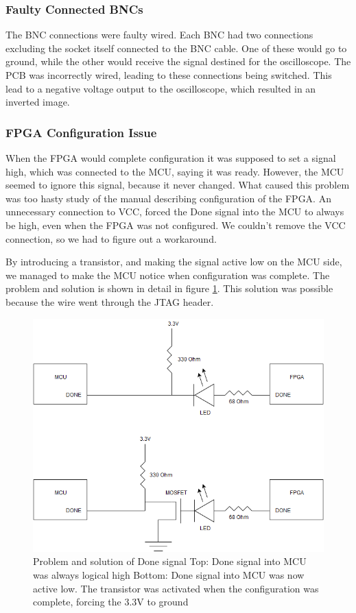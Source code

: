 \subsubsection{Faulty Connected BNCs}
The BNC connections were faulty wired. Each BNC had two connections excluding the socket itself connected to the BNC cable. One of these would go to ground, while the other would receive the signal destined for the oscilloscope. The PCB was incorrectly wired, leading to these connections being switched. This lead to a negative voltage output to the oscilloscope, which resulted in an inverted image. 

\subsubsection{FPGA Configuration Issue}
When the FPGA would complete configuration it was supposed to set a signal high, which was connected to the MCU, saying it was ready. However, the MCU seemed to ignore this signal, because it never changed. What caused this problem was too hasty study of the manual describing configuration of the FPGA.
An unnecessary connection to VCC, forced the Done signal into the MCU to always be high, even when the FPGA was not configured. We couldn't remove the VCC connection, so we had to figure out a workaround.

By introducing a transistor, and making the signal active low on the MCU side, we managed to make the MCU notice when configuration was complete.
The problem and solution is shown in detail in figure \ref{fig:Done Issue}.
This solution was possible because the wire went through the JTAG header. 

\begin{figure}[h!]
\centering
\includegraphics[scale=0.5]{images/Done_Signal_Issue.png}
\caption{Problem and solution of Done signal
         \newline
         Top: Done signal into MCU was always logical high
         \newline
         Bottom: Done signal into MCU was now active low. The transistor was activated when the configuration was complete, forcing the 3.3V to ground}
\label{fig:Done Issue}
\end{figure}

